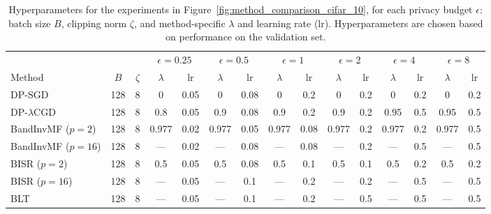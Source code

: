 \documentclass{article}
\theoremstyle{plain}
\theoremstyle{definition}
\theoremstyle{remark}
\begin{document}
\begin{table}[t]
\caption{Hyperparameters for the experiments in Figure~\ref{fig:method_comparison_cifar_10}, for each privacy budget $\epsilon$: batch size $B$, clipping norm $\zeta$, and method-specific $\lambda$ and learning rate (lr). Hyperparameters are chosen based on performance on the validation set.
}
\centering
\small
\setlength{\tabcolsep}{4pt}
\begin{tabular}{lcccccccccccccc}
\toprule
& & &
\multicolumn{2}{c}{$\epsilon=0.25$}
& \multicolumn{2}{c}{$\epsilon=0.5$}
& \multicolumn{2}{c}{$\epsilon=1$}
& \multicolumn{2}{c}{$\epsilon=2$}
& \multicolumn{2}{c}{$\epsilon=4$}
& \multicolumn{2}{c}{$\epsilon=8$} \\
\cmidrule(lr){4-5}\cmidrule(lr){6-7}\cmidrule(lr){8-9}\cmidrule(lr){10-11}\cmidrule(lr){12-13}\cmidrule(lr){14-15}
Method & $B$ & $\zeta$
& $\lambda$ & lr
& $\lambda$ & lr
& $\lambda$ & lr
& $\lambda$ & lr
& $\lambda$ & lr
& $\lambda$ & lr \\
\midrule
DP-SGD
& 128 & 8
& 0 & 0.05
& 0 & 0.08
& 0 & 0.2
& 0 & 0.2
& 0 & 0.2
& 0 & 0.2 \\

DP-$\lambda$CGD
& 128 & 8
& 0.8  & 0.05
& 0.9  & 0.08
& 0.9  & 0.2
& 0.9  & 0.2
& 0.95 & 0.5
& 0.95 & 0.5 \\

BandInvMF ($p=2$)
& 128 & 8
& 0.977 & 0.02
& 0.977 & 0.05
& 0.977 & 0.08
& 0.977 & 0.2
& 0.977 & 0.2
& 0.977 & 0.5 \\

BandInvMF ($p=16$)
& 128 & 8
& --- & 0.02
& --- & 0.08
& --- & 0.08
& --- & 0.2
& --- & 0.5
& --- & 0.5 \\

BISR ($p=2$)
& 128 & 8
& 0.5 & 0.05
& 0.5 & 0.08
& 0.5 & 0.1
& 0.5 & 0.1
& 0.5 & 0.2
& 0.5 & 0.2 \\

BISR ($p=16$)
& 128 & 8
& --- & 0.05
& --- & 0.1
& --- & 0.2
& --- & 0.2
& --- & 0.5
& --- & 0.5 \\

BLT
& 128 & 8
& --- & 0.05
& --- & 0.1
& --- & 0.2
& --- & 0.5
& --- & 0.5
& --- & 0.5 \\
\bottomrule
\end{tabular}

\label{tab:hyperparams}
\end{table}
\end{document}
